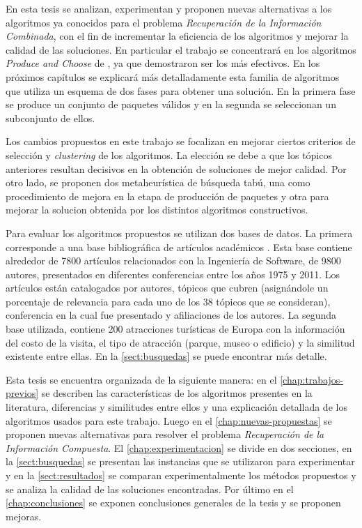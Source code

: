 En esta tesis se analizan, experimentan y proponen nuevas alternativas a los algoritmos ya conocidos para el problema {\em Recuperación de la Información Combinada}, con el fin de incrementar la eficiencia de los algoritmos y mejorar la calidad de las soluciones. En particular el trabajo se concentrará en los algoritmos {\em Produce and Choose} de \cite{journals/tkde/Amer-YahiaBCFMZ14}, ya que demostraron ser los más efectivos. En los próximos capítulos se explicará más detalladamente esta familia de algoritmos que utiliza un esquema de dos fases para obtener una solución. En la primera fase se produce un conjunto de paquetes válidos y en la segunda se seleccionan un subconjunto de ellos.

Los cambios propuestos en este trabajo se focalizan en mejorar ciertos criterios de selección y {\em clustering} de los algoritmos. La elección se debe a que los tópicos anteriores resultan decisivos en la obtención de soluciones de mejor calidad. Por otro lado, se proponen dos metaheurística de búsqueda tabú, una como procedimiento de mejora en la etapa de producción de paquetes y otra para mejorar la solucion obtenida por los distintos algoritmos constructivos.

Para evaluar los algoritmos propuestos se utilizan dos bases de datos. La primera corresponde a una base bibliográfica de artículos académicos \cite{dataDrive}. Esta base contiene alrededor de 7800 artículos relacionados con la Ingeniería de Software, de 9800 autores, presentados en diferentes conferencias entre los años 1975 y 2011. Los artículos están catalogados por autores, tópicos que cubren (asignándole un porcentaje de relevancia para cada uno de los 38 tópicos que se consideran), conferencia en la cual fue presentado y afiliaciones de los autores. La segunda base utilizada, contiene 200 atracciones turísticas de Europa con la información del costo de la visita, el tipo de atracción (parque, museo o edificio) y la similitud existente entre ellas. En la \autoref{sect:busquedas} se puede encontrar más detalle.

Esta tesis se encuentra organizada de la siguiente manera: en el \autoref{chap:trabajos-previos} se describen las características de los algoritmos presentes en la literatura, diferencias y similitudes entre ellos y una explicación detallada de los algoritmos usados para este trabajo. Luego en el \autoref{chap:nuevas-propuestas} se proponen nuevas alternativas para resolver el problema {\em Recuperación de la Información Compuesta}. El \autoref{chap:experimentacion} se divide en dos secciones, en la \autoref{sect:busquedas} se presentan las instancias que se utilizaron para experimentar y en la \autoref{sect:resultados} se 
comparan experimentalmente los métodos propuestos y se analiza la calidad de las soluciones encontradas. Por último en el \autoref{chap:conclusiones} se exponen conclusiones generales de la tesis y se proponen mejoras.
